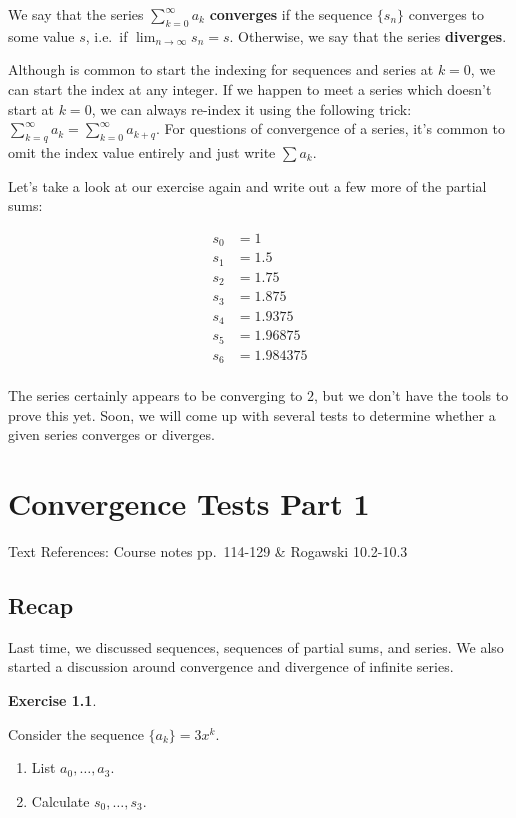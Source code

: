 \documentclass[
]{book}
\providecommand{\tightlist}{%
  \setlength{\itemsep}{0pt}\setlength{\parskip}{0pt}}
\theoremstyle{definition}
\theoremstyle{definition}
\theoremstyle{definition}
\newtheorem{exercise}{Exercise}[chapter]
\theoremstyle{definition}
\theoremstyle{remark}
\begin{document}
We say that the series \(\sum_{k=0}^\infty a_k\) \textbf{converges} if the sequence \(\{s_n\}\) converges to some value \(s\), i.e.~if \(\displaystyle \lim_{n\to\infty}s_n=s\). Otherwise, we say that the series \textbf{diverges}.

Although is common to start the indexing for sequences and series at \(k=0\), we can start the index at any integer. If we happen to meet a series which doesn't start at \(k=0\), we can always re-index it using the following trick: \(\displaystyle \sum_{k=q}^\infty a_k = \sum_{k=0}^\infty a_{k+q}\). For questions of convergence of a series, it's common to omit the index value entirely and just write \(\displaystyle \sum a_k\).

Let's take a look at our exercise again and write out a few more of the partial sums:

\begin{align*}
s_0 & = 1\\
s_1 & = 1.5\\
s_2 & = 1.75\\
s_3 & = 1.875\\
s_4 & = 1.9375\\
s_5 & = 1.96875\\
s_6 & = 1.984375\\
\end{align*}

The series certainly appears to be converging to \(2\), but we don't have the tools to prove this yet. Soon, we will come up with several tests to determine whether a given series converges or diverges.

\hypertarget{lec-26}{%
\chapter{Convergence Tests Part 1}\label{lec-26}}

Text References: Course notes pp.~114-129 \& Rogawski 10.2-10.3

\hypertarget{recap-24}{%
\section{Recap}\label{recap-24}}

Last time, we discussed sequences, sequences of partial sums, and series. We also started a discussion around convergence and divergence of infinite series.

\begin{exercise}
\protect\hypertarget{exr:unlabeled-div-174}{}\label{exr:unlabeled-div-174}

Consider the sequence \(\{a_k\}=3x^k\).

\begin{enumerate}
\def\labelenumi{\alph{enumi}.}
\tightlist
\item
  List \(a_0,\ldots, a_3\).
\item
  Calculate \(s_0,\ldots, s_3\).
\end{enumerate}

\end{exercise}
\end{document}
